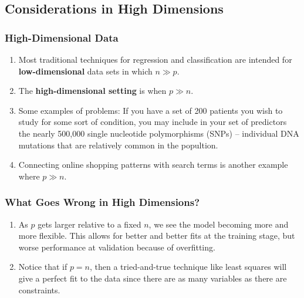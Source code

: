 \documentclass[10pt]{article}
\begin{document}
\subsection{Considerations in High Dimensions}

\subsubsection{High-Dimensional Data} 
\begin{enumerate}
	\item Most traditional techniques for regression and classification are intended for \textbf{low-dimensional} data sets in which $n \gg p$.
	\item The \textbf{high-dimensional setting} is when $p \gg n$.  
	\item Some examples of problems: If you have a set of 200 patients you wish to study for some sort of condition, you may include in your set of predictors the nearly 500,000 single nucleotide polymorphisms (SNPs) -- individual DNA mutations that are relatively common in the popultion.
	\item Connecting online shopping patterns with search terms is another example where $p \gg n$.  
\end{enumerate}

\subsubsection{What Goes Wrong in High Dimensions?}
\begin{enumerate}
	\item As $p$ gets larger relative to a fixed $n$, we see the model becoming more and more flexible.  This allows for better and better fits at the training stage, but worse performance at validation because of overfitting.
	\item Notice that if $p = n$, then a tried-and-true technique like least squares will give a perfect fit to the data since there are as many variables as there are constraints.  
\end{enumerate}
\end{document}
